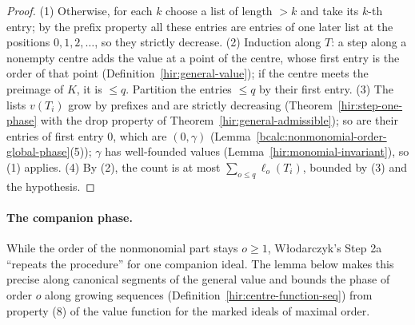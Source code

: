 \begin{proof}
\mixedleanok
(1) Otherwise, for each \(k\) choose a list of length \(>k\) and take its \(k\)-th entry; by the prefix property all these entries are entries of one later list at the
positions \(0,1,2,\dots\), so they strictly decrease.
(2) Induction along \(T\): a step along a nonempty centre adds the value at a point of the centre, whose first entry is the order of that point
(Definition~\ref{hir:general-value}); if the centre meets the preimage of \(K\), it is \(\le q\). Partition the entries \(\le q\) by their first entry.
(3) The lists \(v(T_i)\) grow by prefixes and are strictly decreasing (Theorem~\ref{hir:step-one-phase} with the drop property of Theorem~\ref{hir:general-admissible});
so are their entries of first entry \(0\), which are \((0,\gamma)\) (Lemma~\ref{bcalc:nonmonomial-order-global-phase}(5)); \(\gamma\) has well-founded values
(Lemma~\ref{hir:monomial-invariant}), so (1) applies.
(4) By (2), the count is at most \(\sum_{o\le q}\ell_o(T_i)\), bounded by (3) and the hypothesis.
\end{proof}

\paragraph{The companion phase.} While the order of the nonmonomial part stays \(o\ge1\), Włodarczyk's Step 2a ``repeats the procedure'' for one
companion ideal. The lemma below makes this precise along canonical segments of the general value and bounds the phase of order \(o\) along growing
sequences (Definition~\ref{hir:centre-function-seq}) from property (8) of the value function for the marked ideals of maximal order.

